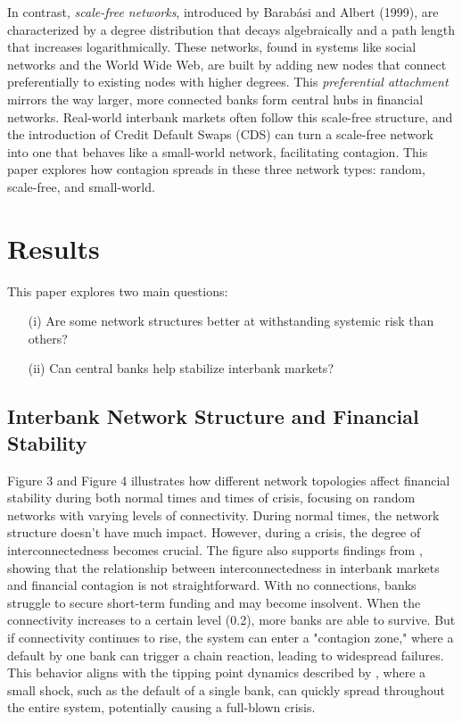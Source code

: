 \documentclass{article} %
\begin{document}
In contrast, \textit{scale-free networks}, introduced by Barabási and Albert (1999), are characterized by a degree distribution that decays algebraically and a path length that increases logarithmically. These networks, found in systems like social networks and the World Wide Web, are built by adding new nodes that connect preferentially to existing nodes with higher degrees. This \textit{preferential attachment} mirrors the way larger, more connected banks form central hubs in financial networks. Real-world interbank markets often follow this scale-free structure, and the introduction of Credit Default Swaps (CDS) can turn a scale-free network into one that behaves like a small-world network, facilitating contagion. This paper explores how contagion spreads in these three network types: random, scale-free, and small-world.

\section{Results}

This paper explores two main questions:
\begin{itemize}
    \item[(i)] Are some network structures better at withstanding systemic risk than others?
    \item[(ii)] Can central banks help stabilize interbank markets?
\end{itemize}

\subsection{Interbank Network Structure and Financial Stability}
Figure 3 and Figure 4 illustrates how different network topologies affect financial stability during both normal times and times of crisis, focusing on random networks with varying levels of connectivity. During normal times, the network structure doesn’t have much impact. However, during a crisis, the degree of interconnectedness becomes crucial. The figure also supports findings from \cite{nier2008network}, showing that the relationship between interconnectedness in interbank markets and financial contagion is not straightforward. With no connections, banks struggle to secure short-term funding and may become insolvent. When the connectivity increases to a certain level (0.2), more banks are able to survive. But if connectivity continues to rise, the system can enter a "contagion zone," where a default by one bank can trigger a chain reaction, leading to widespread failures. This behavior aligns with the tipping point dynamics described by \cite{gai2010contagion}, where a small shock, such as the default of a single bank, can quickly spread throughout the entire system, potentially causing a full-blown crisis.
\end{document}
